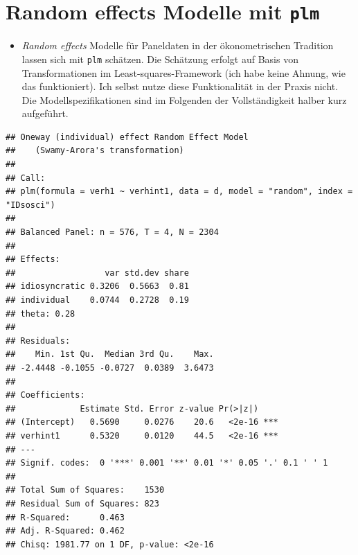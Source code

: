 \documentclass[
]{book}
\newenvironment{Shaded}{\begin{snugshade}}{\end{snugshade}}
\newcommand{\CommentTok}[1]{\textcolor[rgb]{0.56,0.35,0.01}{\textit{#1}}}
\newcommand{\DataTypeTok}[1]{\textcolor[rgb]{0.13,0.29,0.53}{#1}}
\newcommand{\KeywordTok}[1]{\textcolor[rgb]{0.13,0.29,0.53}{\textbf{#1}}}
\newcommand{\NormalTok}[1]{#1}
\newcommand{\OperatorTok}[1]{\textcolor[rgb]{0.81,0.36,0.00}{\textbf{#1}}}
\newcommand{\StringTok}[1]{\textcolor[rgb]{0.31,0.60,0.02}{#1}}
\providecommand{\tightlist}{%
  \setlength{\itemsep}{0pt}\setlength{\parskip}{0pt}}
\begin{document}
\hypertarget{random-effects-modelle-mit-plm}{%
\section{\texorpdfstring{Random effects Modelle mit \texttt{plm}}{Random effects Modelle mit plm}}\label{random-effects-modelle-mit-plm}}

\begin{itemize}
\tightlist
\item
  \emph{Random effects} Modelle für Paneldaten in der ökonometrischen Tradition lassen sich mit \texttt{plm} schätzen. Die Schätzung erfolgt auf Basis von Transformationen im Least-squares-Framework (ich habe keine Ahnung, wie das funktioniert). Ich selbst nutze diese Funktionalität in der Praxis nicht. Die Modellspezifikationen sind im Folgenden der Vollständigkeit halber kurz aufgeführt.
\end{itemize}

\begin{Shaded}
\end{Shaded}

\begin{verbatim}
## Oneway (individual) effect Random Effect Model 
##    (Swamy-Arora's transformation)
## 
## Call:
## plm(formula = verh1 ~ verhint1, data = d, model = "random", index = "IDsosci")
## 
## Balanced Panel: n = 576, T = 4, N = 2304
## 
## Effects:
##                  var std.dev share
## idiosyncratic 0.3206  0.5663  0.81
## individual    0.0744  0.2728  0.19
## theta: 0.28
## 
## Residuals:
##    Min. 1st Qu.  Median 3rd Qu.    Max. 
## -2.4448 -0.1055 -0.0727  0.0389  3.6473 
## 
## Coefficients:
##             Estimate Std. Error z-value Pr(>|z|)    
## (Intercept)   0.5690     0.0276    20.6   <2e-16 ***
## verhint1      0.5320     0.0120    44.5   <2e-16 ***
## ---
## Signif. codes:  0 '***' 0.001 '**' 0.01 '*' 0.05 '.' 0.1 ' ' 1
## 
## Total Sum of Squares:    1530
## Residual Sum of Squares: 823
## R-Squared:      0.463
## Adj. R-Squared: 0.462
## Chisq: 1981.77 on 1 DF, p-value: <2e-16
\end{verbatim}
\end{document}
